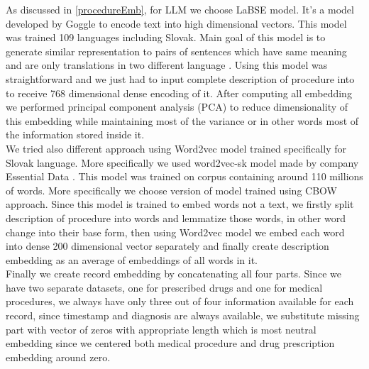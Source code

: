 As discussed in \ref{procedureEmb}, for LLM we choose LaBSE model. It's a model developed by Goggle to encode text into high dimensional vectors. This model was trained 109 languages including Slovak. Main goal of this model is to generate similar representation to pairs of sentences which have same meaning and are only translations in two different language \cite{labse_kaggle}. Using this model was straightforward and we just had to input complete description of procedure into to receive 768 dimensional dense encoding of it. After computing all embedding we performed principal component analysis (PCA) to reduce dimensionality of this embedding while maintaining most of the variance or in other words most of the information stored inside it.
\\

We tried also different approach using Word2vec model trained specifically for Slovak language. More specifically we used word2vec-sk model made by company Essential Data \cite{w2v}. This model was trained on corpus containing around 110 millions of words. More specifically we choose version of model trained using CBOW approach. Since this model is trained to embed words not a text, we firstly split description of procedure into words and lemmatize those words, in other word change into their base form, then using Word2vec model we embed each word into dense 200 dimensional vector separately and finally create description embedding as an average of embeddings of all words in it.
\\

Finally we create record embedding by concatenating all four parts. Since we have two separate datasets, one for prescribed drugs and one for medical procedures, we always have only three out of four information available for each record, since timestamp and diagnosis are always available, we substitute missing part with vector of zeros with appropriate length which is most neutral embedding since we centered both medical procedure and drug prescription embedding around zero.
